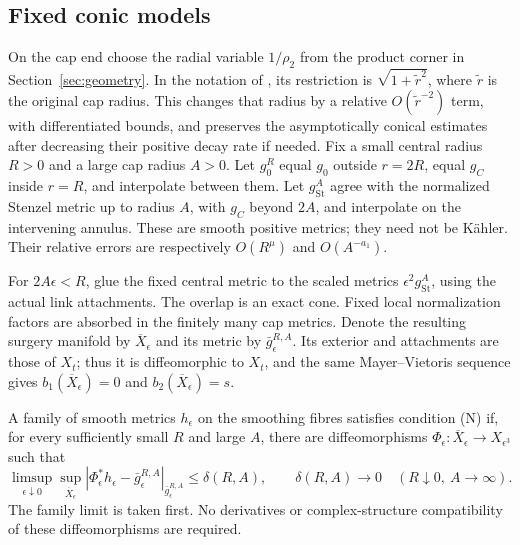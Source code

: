 \subsection{Fixed conic models}
On the cap end choose the radial variable $1/\rho_2$ from the product
corner in Section~\ref{sec:geometry}. In the notation of
\cite[\S5.3.2]{benabida}, its restriction is
$\sqrt{1+\widetilde r^2}$, where $\widetilde r$ is the original cap
radius. This changes that radius by a relative $O(\widetilde r^{-2})$
term, with differentiated bounds, and preserves the asymptotically
conical estimates after decreasing their positive decay rate if needed.
Fix a small central radius $R>0$ and a large cap radius $A>0$.
Let $g_0^R$ equal $g_0$ outside $r=2R$, equal $g_C$ inside $r=R$,
and interpolate between them. Let $g_{\mathrm{St}}^A$ agree with the
normalized Stenzel metric up to radius $A$, with $g_C$ beyond $2A$,
and interpolate on the intervening annulus. These are smooth positive
metrics; they need not be K\"ahler. Their relative errors are respectively
$O(R^\mu)$ and $O(A^{-a_1})$.

For $2A\epsilon<R$, glue the fixed central metric to the scaled metrics
$\epsilon^2g_{\mathrm{St}}^A$, using the actual link attachments. The
overlap is an exact cone. Fixed local normalization factors are absorbed
in the finitely many cap metrics. Denote the resulting surgery manifold by $\overline X_\epsilon$ and its
metric by $\bar g_\epsilon^{R,A}$. Its exterior and attachments are those
of $X_t$; thus it is diffeomorphic to $X_t$, and the same Mayer--Vietoris
sequence gives $b_1(\overline X_\epsilon)=0$ and
$b_2(\overline X_\epsilon)=s$.

\begin{definition}[$C^0$ comparison]\label{def:C0-comparison}
A family of smooth metrics $h_\epsilon$ on the smoothing fibres satisfies
condition \textup{(N)} if, for every sufficiently small $R$ and large $A$,
there are diffeomorphisms
$\Phi_\epsilon:\overline X_\epsilon\longrightarrow X_{\epsilon^3}$ such that
\begin{equation}\label{eq:condition-N}
 \limsup_{\epsilon\downarrow0}\sup_{\overline X_\epsilon}
 |\Phi_\epsilon^*h_\epsilon-\bar g_\epsilon^{R,A}|_{\bar g_\epsilon^{R,A}}
 \le\delta(R,A),\qquad
 \delta(R,A)\longrightarrow0\quad(R\downarrow0,\ A\to\infty).
\end{equation}
The family limit is taken first. No derivatives or complex-structure
compatibility of these diffeomorphisms are required.
\end{definition}

